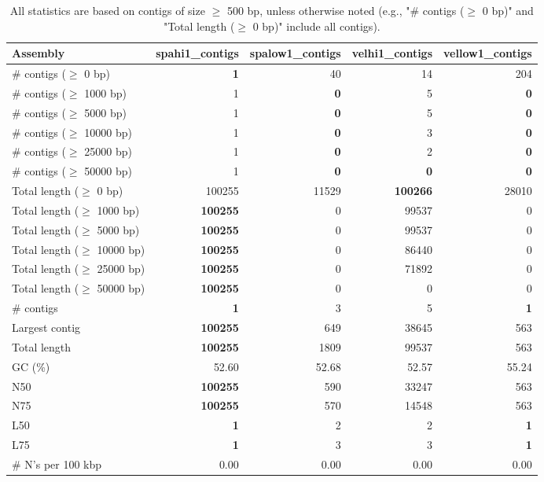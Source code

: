 \documentclass[12pt,a4paper]{article}
\begin{document}
\begin{table}[ht]
\begin{center}
\caption{All statistics are based on contigs of size $\geq$ 500 bp, unless otherwise noted (e.g., "\# contigs ($\geq$ 0 bp)" and "Total length ($\geq$ 0 bp)" include all contigs).}
\begin{tabular}{|l*{4}{|r}|}
\hline
Assembly & spahi1\_contigs & spalow1\_contigs & velhi1\_contigs & vellow1\_contigs \\ \hline
\# contigs ($\geq$ 0 bp) & {\bf 1} & 40 & 14 & 204 \\ \hline
\# contigs ($\geq$ 1000 bp) & 1 & {\bf 0} & 5 & {\bf 0} \\ \hline
\# contigs ($\geq$ 5000 bp) & 1 & {\bf 0} & 5 & {\bf 0} \\ \hline
\# contigs ($\geq$ 10000 bp) & 1 & {\bf 0} & 3 & {\bf 0} \\ \hline
\# contigs ($\geq$ 25000 bp) & 1 & {\bf 0} & 2 & {\bf 0} \\ \hline
\# contigs ($\geq$ 50000 bp) & 1 & {\bf 0} & {\bf 0} & {\bf 0} \\ \hline
Total length ($\geq$ 0 bp) & 100255 & 11529 & {\bf 100266} & 28010 \\ \hline
Total length ($\geq$ 1000 bp) & {\bf 100255} & 0 & 99537 & 0 \\ \hline
Total length ($\geq$ 5000 bp) & {\bf 100255} & 0 & 99537 & 0 \\ \hline
Total length ($\geq$ 10000 bp) & {\bf 100255} & 0 & 86440 & 0 \\ \hline
Total length ($\geq$ 25000 bp) & {\bf 100255} & 0 & 71892 & 0 \\ \hline
Total length ($\geq$ 50000 bp) & {\bf 100255} & 0 & 0 & 0 \\ \hline
\# contigs & {\bf 1} & 3 & 5 & {\bf 1} \\ \hline
Largest contig & {\bf 100255} & 649 & 38645 & 563 \\ \hline
Total length & {\bf 100255} & 1809 & 99537 & 563 \\ \hline
GC (\%) & 52.60 & 52.68 & 52.57 & 55.24 \\ \hline
N50 & {\bf 100255} & 590 & 33247 & 563 \\ \hline
N75 & {\bf 100255} & 570 & 14548 & 563 \\ \hline
L50 & {\bf 1} & 2 & 2 & {\bf 1} \\ \hline
L75 & {\bf 1} & 3 & 3 & {\bf 1} \\ \hline
\# N's per 100 kbp & 0.00 & 0.00 & 0.00 & 0.00 \\ \hline
\end{tabular}
\end{center}
\end{table}
\end{document}
